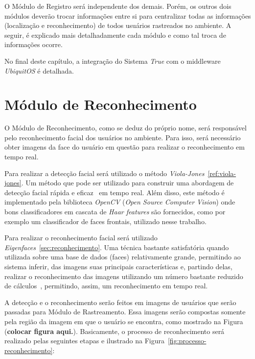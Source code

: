 O Módulo de Registro será independente dos demais. Porém, os outros dois módulos deverão trocar informações entre si para centralizar todas as informações (localização e reconhecimento) de todos usuários rastreados no ambiente. A seguir, é explicado mais detalhadamente cada módulo e como tal troca de informações ocorre.

No final deste capítulo, a integração do Sistema \textit{True} com o middleware \textit{UbiquitOS} é detalhada.

\section{Módulo de Reconhecimento}

	O Módulo de Reconhecimento, como se deduz do próprio nome, será responsável pelo reconhecimento facial dos usuários no ambiente. Para isso, será necessário obter imagens da face do usuário em questão para realizar o reconhecimento em tempo real. 

	Para realizar a detecção facial será utilizado o método \textit{Viola-Jones}~\ref{ref:viola-jones}. Um método que pode ser utilizado para construir uma abordagem de detecção facial rápida e eficaz~\cite{violajones} em tempo real. Além disso, este método é implementado pela biblioteca \textit{OpenCV} (\textit{Open Source Computer Vision}) onde bons classificadores em cascata de \textit{Haar features} são fornecidos, como por exemplo um classificador de faces frontais, utilizado nesse trabalho.

	Para realizar o reconhecimento facial será utilizado \textit{Eigenfaces}~\ref{sec:reconhecimento}. Uma técnica bastante satisfatória quando utilizada sobre uma base de dados (faces) relativamente grande, permitindo ao sistema inferir, das imagens suas principais características e, partindo delas, realizar o reconhecimento das imagens utilizando um número bastante reduzido de cálculos~\cite{artigo-eigenface}, permitindo, assim, um reconhecimento em tempo real.

	A detecção e o reconhecimento serão feitos em imagens de usuários que serão passadas para Módulo de Rastreamento. Essa imagens serão compostas somente pela região da imagem em que o usuário se encontra, como mostrado na Figura (\textbf{colocar figura aqui.}). Basicamente, o processo de reconhecimento será realizado pelas seguintes etapas e ilustrado na Figura~\ref{fig:processo-reconhecimento}:

